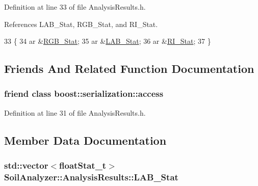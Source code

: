 Definition at line 33 of file Analysis\+Results.\+h.



References L\+A\+B\+\_\+\+Stat, R\+G\+B\+\_\+\+Stat, and R\+I\+\_\+\+Stat.


\begin{DoxyCode}
33                                                           \{
34     ar &\hyperlink{class_soil_analyzer_1_1_analysis_results_ab35eca5f2cfca4b80797cfc314d5cdf5}{RGB\_Stat};
35     ar &\hyperlink{class_soil_analyzer_1_1_analysis_results_ae931f7b47ece1f91dc3427520ef4a9b2}{LAB\_Stat};
36     ar &\hyperlink{class_soil_analyzer_1_1_analysis_results_a3bbccb36afd62b9a35b7afa578c4919d}{RI\_Stat};
37   \}
\end{DoxyCode}


\subsection{Friends And Related Function Documentation}
\hypertarget{class_soil_analyzer_1_1_analysis_results_ac98d07dd8f7b70e16ccb9a01abf56b9c}{}
\subsubsection[{boost\+::serialization\+::access}]{\setlength{\rightskip}{0pt plus 5cm}friend class boost\+::serialization\+::access\hspace{0.3cm}{\ttfamily [friend]}}\label{class_soil_analyzer_1_1_analysis_results_ac98d07dd8f7b70e16ccb9a01abf56b9c}


Definition at line 31 of file Analysis\+Results.\+h.



\subsection{Member Data Documentation}
\hypertarget{class_soil_analyzer_1_1_analysis_results_ae931f7b47ece1f91dc3427520ef4a9b2}{}
\subsubsection[{L\+A\+B\+\_\+\+Stat}]{\setlength{\rightskip}{0pt plus 5cm}std\+::vector$<${\bf float\+Stat\+\_\+t}$>$ Soil\+Analyzer\+::\+Analysis\+Results\+::\+L\+A\+B\+\_\+\+Stat}\label{class_soil_analyzer_1_1_analysis_results_ae931f7b47ece1f91dc3427520ef4a9b2}


